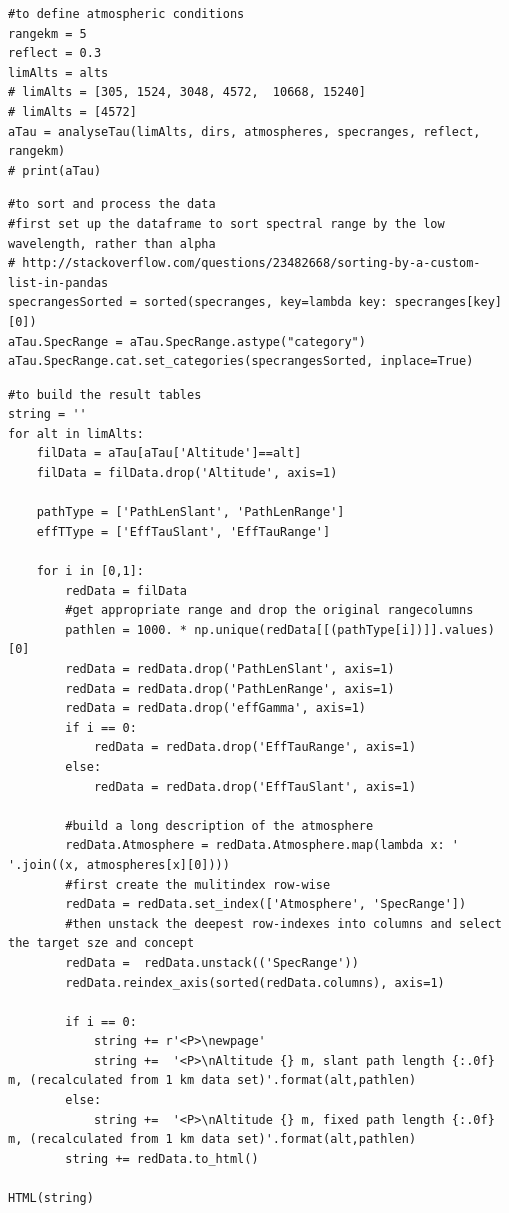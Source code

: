 \documentclass{workpackage}
\begin{document}
\begin{lstlisting}[style=incellstyle,caption={Code Listing in cell 29 \label{lst:autolistingcell29}}]
#to define atmospheric conditions
rangekm = 5 
reflect = 0.3
limAlts = alts
# limAlts = [305, 1524, 3048, 4572,  10668, 15240]
# limAlts = [4572]
aTau = analyseTau(limAlts, dirs, atmospheres, specranges, reflect, rangekm)
# print(aTau)

\end{lstlisting}


\begin{lstlisting}[style=incellstyle,caption={Code Listing in cell 30 \label{lst:autolistingcell30}}]
#to sort and process the data
#first set up the dataframe to sort spectral range by the low wavelength, rather than alpha
# http://stackoverflow.com/questions/23482668/sorting-by-a-custom-list-in-pandas
specrangesSorted = sorted(specranges, key=lambda key: specranges[key][0])
aTau.SpecRange = aTau.SpecRange.astype("category")
aTau.SpecRange.cat.set_categories(specrangesSorted, inplace=True)

\end{lstlisting}


\begin{lstlisting}[style=incellstyle,caption={Code Listing in cell 32 \label{lst:autolistingcell32}}]
#to build the result tables
string = ''
for alt in limAlts:
    filData = aTau[aTau['Altitude']==alt]
    filData = filData.drop('Altitude', axis=1)
    
    pathType = ['PathLenSlant', 'PathLenRange']
    effTType = ['EffTauSlant', 'EffTauRange']
    
    for i in [0,1]:
        redData = filData
        #get appropriate range and drop the original rangecolumns
        pathlen = 1000. * np.unique(redData[[(pathType[i])]].values)[0]
        redData = redData.drop('PathLenSlant', axis=1)
        redData = redData.drop('PathLenRange', axis=1)
        redData = redData.drop('effGamma', axis=1)
        if i == 0:
            redData = redData.drop('EffTauRange', axis=1)
        else:
            redData = redData.drop('EffTauSlant', axis=1)
            
        #build a long description of the atmosphere
        redData.Atmosphere = redData.Atmosphere.map(lambda x: ' '.join((x, atmospheres[x][0])))
        #first create the mulitindex row-wise
        redData = redData.set_index(['Atmosphere', 'SpecRange'])
        #then unstack the deepest row-indexes into columns and select the target sze and concept 
        redData =  redData.unstack(('SpecRange'))
        redData.reindex_axis(sorted(redData.columns), axis=1)

        if i == 0:
            string += r'<P>\newpage'
            string +=  '<P>\nAltitude {} m, slant path length {:.0f} m, (recalculated from 1 km data set)'.format(alt,pathlen)
        else:
            string +=  '<P>\nAltitude {} m, fixed path length {:.0f} m, (recalculated from 1 km data set)'.format(alt,pathlen)
        string += redData.to_html()

HTML(string)
\end{lstlisting}
\end{document}
